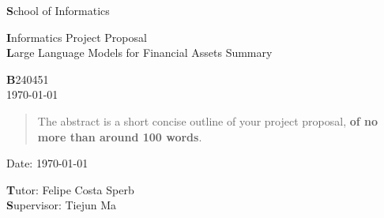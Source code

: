 \documentclass[a4paper,11pt]{article}
\newcommand{\examnumber}{B240451}
\newcommand{\field}{Large Language Models for Financial Assets Summary}
\newcommand{\tutor}{Felipe Costa Sperb}
\newcommand{\supervisor}{Tiejun Ma}
\begin{document}
\begin{minipage}[b]{110mm}
        {\Huge\textbf School of Informatics
        \vspace*{17mm}}
\end{minipage}
\hfill
\begin{minipage}[t]{40mm}               
\end{minipage}
\par\noindent
\vspace*{2cm}
\begin{center}
        \Large\textbf Informatics Project Proposal \\
        \Large\textbf \field
\end{center}
\vspace*{1.5cm}
\begin{center}
        \textbf \examnumber\\
        \monthyeardate\today
\end{center}
\vspace*{5mm}

%
%                       
\begin{abstract}
        The abstract is a short concise outline of your 
        project proposal, \textbf{of no more than around 100 words}.
\end{abstract}

\vspace*{1cm}

\vspace*{3cm}
Date: \today

\vfill
{\textbf Tutor:} \tutor\\
{\textbf Supervisor:} \supervisor
\newpage

\setcounter{page}{1}                            %
\footruleheight{1pt}
\headruleheight{1pt}
\rhead{- \thepage}
\cfoot{}
%
\end{document}
